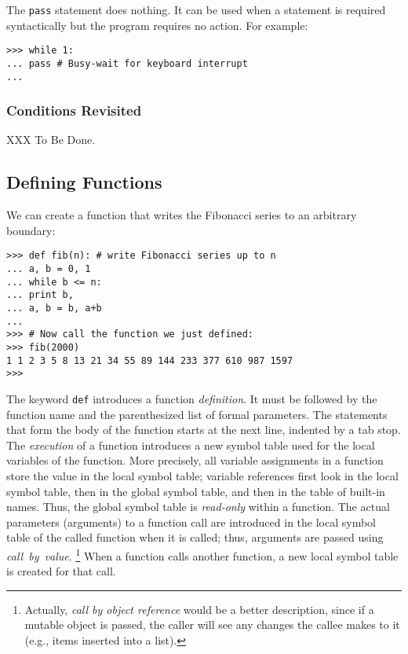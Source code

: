 The {\tt pass} statement does nothing.
It can be used when a statement is required syntactically but the
program requires no action.
For example:
\bcode\begin{verbatim}
>>> while 1:
... pass # Busy-wait for keyboard interrupt
...
\end{verbatim}\ecode

\subsubsection{Conditions Revisited}

XXX To Be Done.

\subsection{Defining Functions}

We can create a function that writes the Fibonacci series to an
arbitrary boundary:
\bcode\begin{verbatim}
>>> def fib(n): # write Fibonacci series up to n
... a, b = 0, 1
... while b <= n:
... print b,
... a, b = b, a+b
...
>>> # Now call the function we just defined:
>>> fib(2000)
1 1 2 3 5 8 13 21 34 55 89 144 233 377 610 987 1597
>>>
\end{verbatim}\ecode
The keyword
{\tt def}
introduces a function
{\em definition}.
It must be followed by the function name and the parenthesized list of
formal parameters.
The statements that form the body of the function starts at the next
line, indented by a tab stop.
The
{\em execution}
of a function introduces a new symbol table used for the local variables
of the function.
More precisely, all variable assignments in a function store the value
in the local symbol table; variable references first look in the local
symbol table, then in the global symbol table, and then in the table of
built-in names.
Thus, the global symbol table is
{\em read-only}
within a function.
The actual parameters (arguments) to a function call are introduced in
the local symbol table of the called function when it is called;
thus, arguments are passed using
{\em call\ by\ value}.%
\footnote{
 Actually, {\em call by object reference} would be a better
 description, since if a mutable object is passed, the caller
 will see any changes the callee makes to it (e.g., items
 inserted into a list).
}
When a function calls another function, a new local symbol table is
created for that call.

